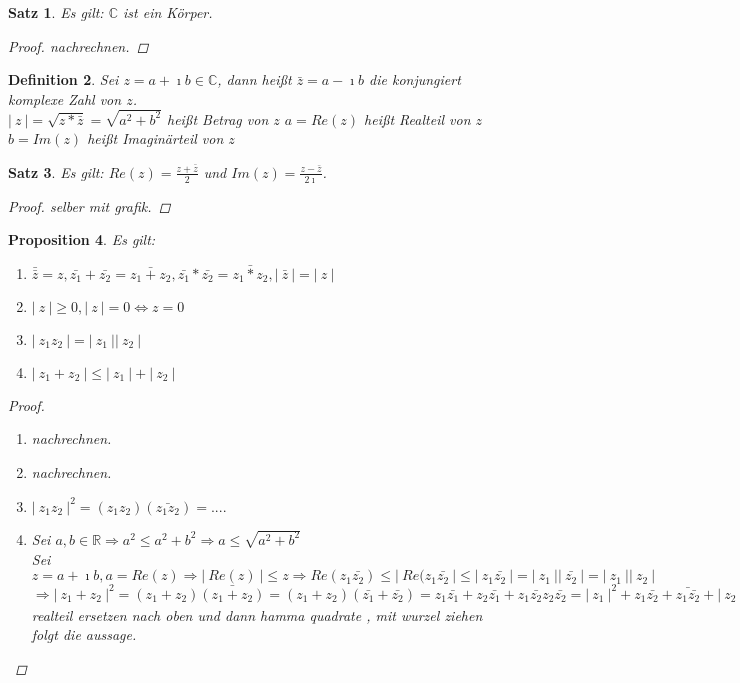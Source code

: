 \documentclass[a4paper,titlepage,oneside]{article}
\def\C{\ensuremath{\mathbb{C}} }
\def\R{\ensuremath{\mathbb{R}} }
\def\im{\ensuremath{\imath} }
\newcommand{\abs}[1]{\ensuremath{\left|\:#1\:\right|}}
\theoremstyle{thmstyle}
\newtheorem{satz}{Satz}[subsection]
\newtheorem{prop}[satz]{Proposition}
\newtheorem{defi}[satz]{Definition}
\begin{document}
\begin{satz}
Es gilt:  \C ist ein Körper.
\begin{proof} nachrechnen. \end{proof} %
\end{satz}

\begin{defi}
Sei \( z = a + \im b \in \C \), dann heißt \(\bar{z} = a - \im b \) die konjungiert komplexe Zahl von $z$. \\
\(\abs{z} = \sqrt{z * \bar{z}} = \sqrt{a^2 + b^2}\) heißt Betrag von \(z\)
$a = Re(z)$ heißt Realteil von $z$
$b = Im(z)$ heißt Imaginärteil von $z$
\end{defi}

\begin{satz}
Es gilt: $Re(z) = \frac{z + \bar{z}}{2}$ und $Im(z) = \frac{z - \bar{z}}{2\im}$.
\begin{proof} selber mit grafik. %
\end{proof}
\end{satz}

\begin{prop}
Es gilt:
\begin{enumerate}[label=(\roman*)]
\item \( \bar{\bar{z}} = z, \bar{z_1} + \bar{z_2} = \bar{z_1 + z_2}, \bar{z_1} * \bar{z_2} = \bar{z_1 * z_2}, \abs{\bar{z}} = \abs{z} \)
\item \( \abs{z} \ge 0, \abs{z} = 0 \Leftrightarrow z = 0\)
\item \(\abs{z_1 z_2} = \abs{z_1} \abs{z_2}\)
\item \(\abs{z_1 + z_2} \le \abs{z_1} + \abs{z_2}\)
\end{enumerate}
\begin{proof}
\begin{enumerate}[label=(\roman*)]
\item nachrechnen. %
\item nachrechnen. %
\item \(\abs{z_1 z_2}^2 = (z_1 z_2)(\bar{z_1 z_2}) =  .... \) \\   %
\item Sei $a, b \in \R \Rightarrow a^2 \le a^2 + b^2 \Rightarrow a \le \sqrt{a^2 + b^2}$ \\
Sei $ z = a + \im b , a = Re(z) \Rightarrow \abs{Re(z)} \le z \Rightarrow Re(z_1 \bar{z_2}) \le \abs{Re(z_1 \bar{z_2}} \le \abs{z_1 \bar{z_2}} = \abs{z_1}\abs{\bar{z_2}} = \abs{z_1}\abs{z_2}$
$\Rightarrow \abs{z_1 + z_2}^2 = (z_1 + z_2)\bar{(z_1 + z_2)} = (z_1 + z_2)(\bar{z_1} + \bar{z_2}) = z_1\bar{z_1} + z_2\bar{z_1} + z_1\bar{z_2} z_2\bar{z_2} = \abs{z_1}^2 + z_1\bar{z_2} + \bar{z_1\bar{z_2}} + \abs{z_2}^2 = |z_1|^2 + 2 Re (z1 \bar{z2}) + |z_2|^2 \le $ realteil ersetzen nach oben und dann hamma quadrate , mit wurzel ziehen folgt die aussage. %
\end{enumerate}
\end{proof}
\end{prop}
\end{document}
